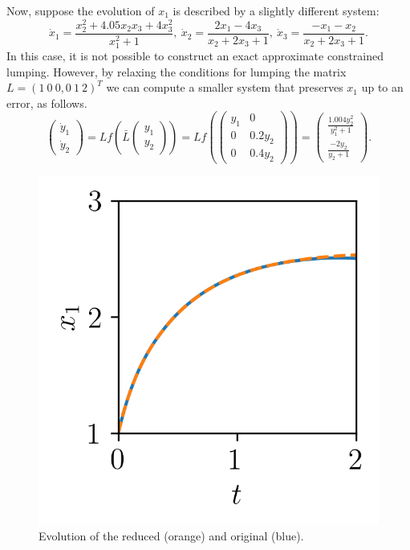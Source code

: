 Now, suppose the evolution of $x_1$ is described by a slightly different system:
\begin{equation} \label{eq:examplepert}
	\dot{x}_{1} = \frac {x_{2}^{2} +4.05x_{2}x_{3} +4x_{3}^{2}}{x_{1}^{2} + 1 },~
	\dot{x}_{2} = \frac{2x_{1}-4x_{3}}{x_{2}+2x_{3} + 1},~
	\dot{x}_{3} = \frac{-x_{1}-x_{2}}{x_{2}+2x_{3}+1}.
\end{equation}
In this case, it is not possible to construct an exact approximate constrained lumping.
However, by relaxing the conditions for lumping the matrix $L = (1 \ 0\ 0, 0\ 1\  2)^{T}$ we can compute a smaller system that preserves $x_1$ up to an error, as follows.
\begin{equation*}
		\begin{pmatrix}
			\dot{y}_{1} \\
			\dot{y}_{2}
		\end{pmatrix}
		= L f \left(  \bar{L}        \begin{pmatrix}
			y_{1} \\
			y_{2}
		\end{pmatrix}
		\right)
		=
		L f \left(
		\begin{pmatrix}
				y_{1} & 0        \\
				0     & 0.2y_{2} \\
				0     & 0.4y_{2}
			\end{pmatrix} \right)
		=
		\begin{pmatrix}
			\frac{1.004y_{2}^{2}}{y_{1}^{2}+1} \\
			\frac{-2y_{2}}{y_{2}+1}
		\end{pmatrix}.
	\end{equation*}
\begin{figure}
		\centering
        \vspace{-0.5cm}
		\includegraphics[width=0.7\linewidth]{./img/sim_red_example.png}
		\caption{Evolution of the reduced (orange) and original (blue).}
		\label{fig:apperr:sim}
\end{figure}

